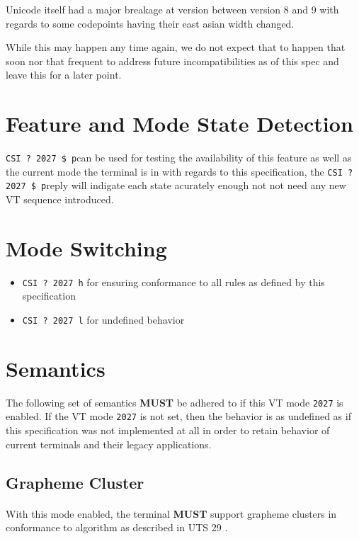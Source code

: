 \documentclass{article}
\newcommand{\code}[1]{\colorbox{light-gray}{\texttt{#1}}}
\newcommand{\DECRQM}[1]{\code{CSI ? #1 \$ p}}
\newcommand{\DECSET}[1]{\code{CSI ? #1 h}}
\newcommand{\DECRST}[1]{\code{CSI ? #1 l}}
\newcommand\VtModeNum{2027}                	%
\newcommand{\GCON}{\DECSET{\VtModeNum{}}}   %
\newcommand{\GCOFF}{\DECRST{\VtModeNum{}}}  %
\newcommand{\GCTEST}{\DECRQM{\VtModeNum{}}} %
\begin{document}
Unicode itself had a major breakage at version between version 8 and 9
with regards to some codepoints having their east asian width changed.

While this may happen any time again, we do not expect that to happen
that soon nor that frequent to address future incompatibilities
as of this spec and leave this for a later point.

\section{Feature and Mode State Detection}

\GCTEST can be used for testing the availability of this
feature as well as the current mode the terminal is in with regards
to this specification, the \GCTEST reply will indigate each state
acurately enough not not need any new VT sequence introduced.

\section{Mode Switching}

\begin{itemize}
	\item \GCON{} for ensuring conformance to all rules as defined by this specification
    \item \GCOFF{} for undefined behavior
\end{itemize}

\section{Semantics}

The following set of semantics \textbf{MUST} be adhered to if this
VT mode \code{\VtModeNum} is enabled.
If the VT mode \code{\VtModeNum} is not set, then the behavior is as undefined
as if this specification was not implemented at all in order to retain
behavior of current terminals and their legacy applications.

\subsection{Grapheme Cluster}

\paragraph*{}
With this mode enabled, the terminal \textbf{MUST} support grapheme clusters
in conformance to algorithm as described in UTS 29 \cite{UTS-29}.
\end{document}
